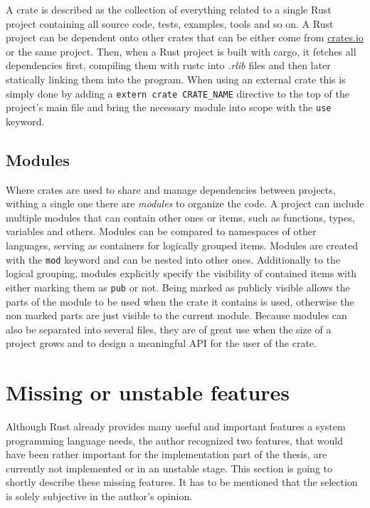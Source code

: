 A crate is described as the collection of everything related to a single Rust project containing all source code, tests, examples, tools and so on. A Rust project can be dependent onto other crates that can be either come from \url{crates.io} or the same project. Then, when a Rust project is built with cargo, it fetches all dependencies first, compiling them with rustc into \textit{.rlib} files and then later statically linking them into the program. When using an external crate this is simply done by adding a \texttt{extern crate CRATE\_NAME} directive to the top of the project's main file and bring the necessary module into scope with the \texttt{use} keyword.

\subsection{Modules}

Where crates are used to share and manage dependencies between projects, withing a single one there are \textit{modules} to organize the code. A project can include multiple modules that can contain other ones or items, such as functions, types, variables and others. Modules can be compared to namespaces of other languages, serving as containers for logically grouped items. Modules are created with the \texttt{mod} keyword and can be nested into other ones. Additionally to the logical grouping, modules explicitly specify the visibility of contained items with either marking them as \texttt{pub} or not. Being marked as publicly visible allows the parts of the module to be used when the crate it contains is used, otherwise the non marked parts are just visible to the current module. Because modules can also be separated into several files, they are of great use when the size of a project grows and to design a meaningful \ac{API} for the user of the crate.

\section{Missing or unstable features}

Although Rust already provides many useful and important features a system programming language needs, the author recognized two features, that would have been rather important for the implementation part of the thesis, are currently not implemented or in an unstable stage. This section is going to shortly describe these missing features. It has to be mentioned that the selection is solely subjective in the author's opinion.

